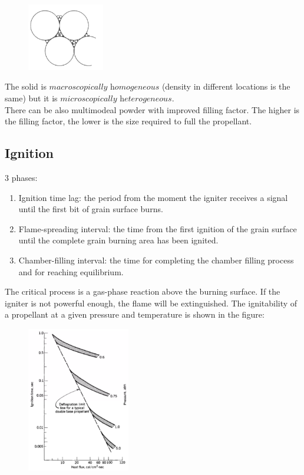 \documentclass[12pt]{article}
\begin{document}
\begin{figure}[!ht]
\centering
\includegraphics[width=0.3\textwidth]{figures/powder2.png}
\end{figure}

The solid is $\textit{macroscopically homogeneous}$ (density in different locations is the same) but it is $\textit{microscopically heterogeneous}$.\\
There can be also multimodeal powder with improved filling factor. The higher is the filling factor, the lower is the size required to full the propellant.

\subsection{Ignition}

3 phases:

\begin{enumerate}
  \item Ignition time lag: the period from the moment the igniter receives a signal until the first bit of grain surface burns.
  \item Flame-spreading interval: the time from the first ignition of the grain surface until the complete grain burning area has been ignited.
  \item Chamber-filling interval: the time for completing the chamber filling process and for reaching equilibrium.
\end{enumerate}

The critical process is a gas-phase reaction above the burning surface. If the igniter is not powerful enough, the flame will be extinguished. The ignitability of a propellant at a given pressure and temperature is shown in the figure:

\begin{figure}[!ht]
\centering
\includegraphics[width=0.4\textwidth]{figures/ignita.png}
\end{figure}
\end{document}
